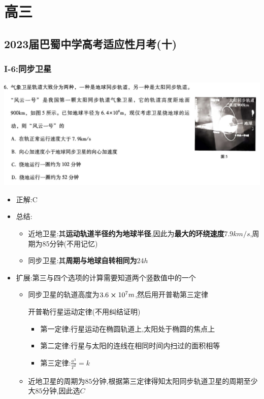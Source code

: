 \documentclass{article}
\begin{document}
\vspace{2em}

\section{高三}

\subsection{2023届巴蜀中学高考适应性月考(十)}
\subsubsection{I-6:同步卫星}
\includegraphics[width=50em,keepaspectratio]{./pictures/3.1-1.png}

\begin{itemize}
    \item 正解:\quad C
    \item 总结:\quad
          \begin{itemize}
              \item 近地卫星:其\textbf{运动轨道半径约为地球半径},因此为\textbf{最大的环绕速度$7.9km/s$},周期为85分钟(不用记忆)
              \item 同步卫星:其\textbf{周期与地球自转相同为$24h$}
          \end{itemize}
    \item 扩展:第三与四个选项的计算需要知道两个竖数值中的一个
          \begin{itemize}
              \item 同步卫星的轨道高度为$3.6 \cross 10^{7} m$,然后用开普勒第三定律
                    \begin{thm*}
                        开普勒行星运动定律(不用纠结证明)
                        \begin{itemize}
                            \item 第一定律:行星运动在椭圆轨道上,太阳处于椭圆的焦点上
                            \item 第二定律:行星与太阳的连线在相同时间内扫过的面积相等
                            \item 第三定律:$\frac{a^{3}}{T^{2}} = k$
                        \end{itemize}
                    \end{thm*}
              \item 近地卫星的周期为$85$分钟,根据第三定律得知太阳同步轨道卫星的周期至少大$85$分钟,因此选$C$
          \end{itemize}
\end{itemize}
\end{document}
